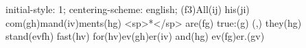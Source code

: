 initial-style: 1;
centering-scheme: english;
(f3)All(ij) his(ji) com(gh)mand(iv)ments(hg) <sp>*</sp> are(fg) true:(g) (,) they(hg) stand(evfh) fast(hv) for(hv)ev(gh)er(iv) and(hg) ev(fg)er.(gv)
